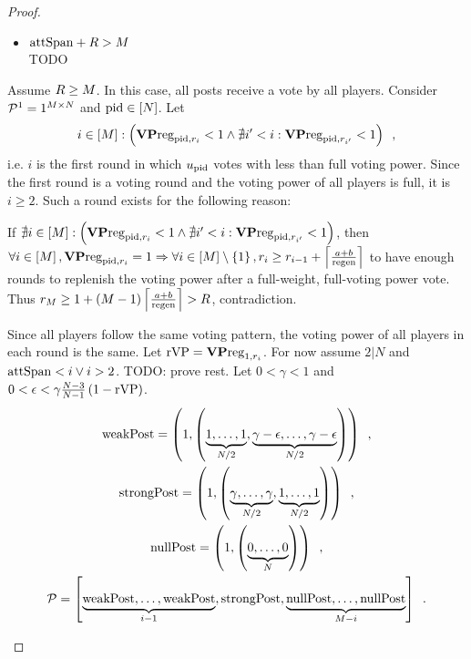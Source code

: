 \begin{proof}
\begin{itemize}
\begin{itemize}
      \item $\attspan + \rounds > \postlen$ \\
      TODO
    \end{itemize}

    Assume $\rounds \geq \postlen$. In this case, all posts receive a vote by
    all players. Consider $\postlist^1 = 1^{\postlen \times \playerlen}$ and
    $\pid \in \left[\playerlen\right]$. Let
    \begin{equation*}
      i \in \left[\postlen\right] :\left(\votpowvecreg_{\pid, \round_i} < 1
      \wedge \nexists i' < i: \votpowvecreg_{\pid, \round_{i'}} < 1\right)
      \enspace,
    \end{equation*}
    i.e. $i$ is the first round in which $u_\pid$ votes with less than full
    voting power. Since the first round is a voting round and the voting power
    of all players is full, it is $i \geq 2$. Such a round exists for the
    following reason:

    If $\nexists i \in \left[\postlen\right] :\left(\votpowvecreg_{\pid,
    \round_i} < 1 \wedge \nexists i' < i: \votpowvecreg_{\pid, \round_{i'}} <
    1\right)$, then $\forall i \in \left[\postlen\right], \votpowvecreg_{\pid,
    \round_i} = 1 \Rightarrow \forall i \in \left[\postlen\right] \setminus
    \left\{1\right\}, \round_i \geq \round_{i - 1} + \ceil*{\frac{a +
    b}{\regen}}$ to have enough rounds to replenish the voting power after a
    full-weight, full-voting power vote. Thus $\round_\postlen \geq 1 +
    \left(\postlen - 1\right)\ceil*{\frac{a + b}{\regen}} > \rounds$,
    contradiction.

    Since all players follow the same voting pattern, the voting power of all
    players in each round is the same. Let $\rvp =
    \votpowvecreg_{1, \round_i}$. For now assume $2 | N$ and $\attspan < i \vee
    i > 2$. TODO: prove rest. Let $0 < \gamma < 1$ and $0 < \epsilon <
    \gamma\frac{\playerlen - 3}{\playerlen - 1}\left(1 -
    \rvp\right)$.
    \begin{gather*}
      \weakpost = \left(1, \left(\underbrace{1, \dots, 1}_{\playerlen/2},
      \underbrace{\gamma - \epsilon, \dots, \gamma -
      \epsilon}_{\playerlen/2}\right)\right) \enspace, \\
      \strongpost = \left(1, \left(\underbrace{\gamma, \dots,
      \gamma}_{\playerlen/2}, \underbrace{1, \dots,
      1}_{\playerlen/2}\right)\right) \enspace, \\
      \nullpost = \left(1, \left(\underbrace{0, \dots,
      0}_{\playerlen}\right)\right) \enspace, \\
      \postlist = \left[\underbrace{\weakpost, \dots, \weakpost}_{i - 1},
      \strongpost, \underbrace{\nullpost, \dots, \nullpost}_{\postlen -
      i}\right] \enspace.
    \end{gather*}


\end{itemize}
\end{proof}

